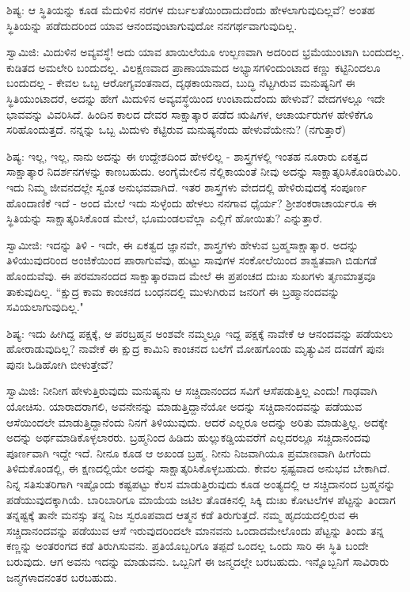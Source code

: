 ಶಿಷ್ಯ: ಆ ಸ್ಥಿತಿಯನ್ನು ಕೂಡ ಮೆದುಳಿನ ನರಗಳ ದುರ್ಬಲತೆಯಿಂದಾದುದೆಂದು ಹೇಳಲಾಗುವುದಿಲ್ಲವೆ? ಅಂತಹ ಸ್ಥಿತಿಯನ್ನು ಪಡೆದುದರಿಂದ ಯಾವ ಆನಂದವುಂಟಾಗುವುದೋ ನನಗರ್ಥವಾಗುವುದಿಲ್ಲ.

ಸ್ವಾಮಿಜಿ: ಮಿದುಳಿನ ಅವ್ಯವಸ್ಥೆ! ಅದು ಯಾವ ಖಾಯಿಲೆಯೂ ಉಲ್ಬಣವಾಗಿ ಅದರಿಂದ ಭ್ರಮೆಯುಂಟಾಗಿ ಬಂದುದಲ್ಲ. ಕುಡಿತದ ಅಮಲೇರಿ ಬಂದುದಲ್ಲ. ವಿಲಕ್ಷಣವಾದ ಪ್ರಾಣಾಯಾಮದ ಅಭ್ಯಾಸಗಳಿಂದುಂಟಾದ ಕಣ್ಣು ಕಟ್ಟಿನಿಂದಲೂ ಬಂದುದಲ್ಲ - ಕೇವಲ ಒಬ್ಬ ಆರೋಗ್ಯವಂತನಾದ, ದೃಢಕಾಯನಾದ, ಬುದ್ಧಿ ನೆಟ್ಟಗಿರುವ ಮನುಷ್ಯನಿಗೆ ಈ ಸ್ಥಿತಿಯುಂಟಾದರೆ, ಅದನ್ನು ಹೇಗೆ ಮಿದುಳಿನ ಅವ್ಯವಸ್ಥೆಯಿಂದ ಉಂಟಾದುದೆಂದು ಹೇಳುವೆ? ವೇದಗಳಲ್ಲೂ ಇದೇ ಭಾವವನ್ನು ವಿವರಿಸಿದೆ. ಹಿಂದಿನ ಕಾಲದ ದೇವರ ಸಾಕ್ಷಾತ್ಕಾರ ಪಡೆದ ಋಷಿಗಳ, ಆಚಾರ್ಯರುಗಳ ಹೇಳಿಕೆಗೂ ಸರಿಹೊಂದುತ್ತದೆ. ನನ್ನನ್ನು ಒಬ್ಬ ಮಿದುಳು ಕೆಟ್ಟಿರುವ ಮನುಷ್ಯನೆಂದು ಹೇಳುವೆಯೇನು? (ನಗುತ್ತಾರೆ)

ಶಿಷ್ಯ: ಇಲ್ಲ, ಇಲ್ಲ, ನಾನು ಅದನ್ನು ಈ ಉದ್ದೇಶದಿಂದ ಹೇಳಲಿಲ್ಲ - ಶಾಸ್ತ್ರಗಳಲ್ಲಿ ಇಂತಹ ನೂರಾರು ಏಕತ್ವದ ಸಾಕ್ಷಾತ್ಕಾರ ನಿದರ್ಶನಗಳನ್ನು ಕಾಣಬಹುದು. ಅಂಗೈಮೇಲಿನ ನೆಲ್ಲಿಕಾಯಂತೆ ನೀವು ಅದನ್ನು ಸಾಕ್ಷಾತ್ಕರಿಸಿಕೊಂಡಿರುವಿರಿ. ಇದು ನಿಮ್ಮ ಜೀವನದಲ್ಲೇ ಸ್ವಂತ ಅನುಭವವಾಗಿದೆ. ಇತರ ಶಾಸ್ತ್ರಗಳು ವೇದದಲ್ಲಿ ಹೇಳಿರುವುದಕ್ಕೆ ಸಂಪೂರ್ಣ ಹೊಂದಾಣಿಕೆ ಇದೆ - ಅಂದ ಮೇಲೆ ಇದು ಸುಳ್ಳೆಂದು ಹೇಳಲು ನನಗಾವ ಧೈರ್ಯ? ಶ‍್ರೀಶಂಕರಾಚಾರ್ಯರೂ ಈ ಸ್ಥಿತಿಯನ್ನು ಸಾಕ್ಷಾತ್ಕರಿಸಿಕೊಂಡ ಮೇಲೆ, ಭೂಮಂಡಲವೆಲ್ಲಾ ಎಲ್ಲಿಗೆ ಹೋಯಿತು? ಎನ್ನುತ್ತಾರೆ.

ಸ್ವಾಮೀಜಿ: ಇದನ್ನು ತಿಳಿ - ಇದೇ, ಈ ಏಕತ್ವದ ಜ್ಞಾನವೇ, ಶಾಸ್ತ್ರಗಳು ಹೇಳುವ ಬ್ರಹ್ಮಸಾಕ್ಷಾತ್ಕಾರ. ಅದನ್ನು ತಿಳಿಯುವುದರಿಂದ ಅಂಜಿಕೆಯಿಂದ ಪಾರಾಗುವೆವು, ಹುಟ್ಟು ಸಾವುಗಳ ಸಂಕೋಲೆಯಿಂದ ಶಾಶ್ವತವಾಗಿ ಬಿಡುಗಡೆ ಹೊಂದುವೆವು. ಈ ಪರಮಾನಂದದ ಸಾಕ್ಷಾತ್ಕಾರವಾದ ಮೇಲೆ ಈ ಪ್ರಪಂಚದ ದುಃಖ ಸುಖಗಳು ತೃಣಮಾತ್ರವೂ ತಾಕುವುದಿಲ್ಲ. “ಕ್ಷುದ್ರ ಕಾಮ ಕಾಂಚನದ ಬಂಧನದಲ್ಲಿ ಮುಳುಗಿರುವ ಜನರಿಗೆ ಈ ಬ್ರಹ್ಮಾನಂದವನ್ನು ಸವಿಯಲಾಗುವುದಿಲ್ಲ."

ಶಿಷ್ಯ: ಇದು ಹೀಗಿದ್ದ ಪಕ್ಷಕ್ಕೆ, ಆ ಪರಬ್ರಹ್ಮನ ಅಂಶವೇ ನಮ್ಮಲ್ಲೂ ಇದ್ದ ಪಕ್ಷಕ್ಕೆ ನಾವೇಕೆ ಆ ಆನಂದವನ್ನು ಪಡೆಯಲು ಹೋರಾಡುವುದಿಲ್ಲ? ನಾವೇಕೆ ಈ ಕ್ಷುದ್ರ ಕಾಮಿನಿ ಕಾಂಚನದ ಬಲೆಗೆ ಮೋಹಗೊಂಡು ಮೃತ್ಯುವಿನ ದವಡೆಗೆ ಪುನಃ ಪುನಃ ಓಡಿಹೋಗಿ ಬೀಳುತ್ತೇವೆ?

ಸ್ವಾಮಿಜಿ: ನೀನೀಗ ಹೇಳುತ್ತಿರುವುದು ಮನುಷ್ಯನು ಆ ಸಚ್ಚಿದಾನಂದದ ಸವಿಗೆ ಆಸೆಪಡುತ್ತಿಲ್ಲ ಎಂದು! ಗಾಢವಾಗಿ ಯೋಚಿಸು. ಯಾರಾದರಾಗಲಿ, ಅವನೇನನ್ನು ಮಾಡುತ್ತಿದ್ದಾನೆಯೋ ಅದನ್ನು ಸಚ್ಚಿದಾನಂದವನ್ನು ಪಡೆಯುವ ಆಸೆಯಿಂದಲೇ ಮಾಡುತ್ತಿದ್ದಾನೆಂದು ನಿನಗೆ ತಿಳಿಯುವುದು. ಆದರೆ ಎಲ್ಲರೂ ಅದನ್ನು ಅರಿತು ಮಾಡುತ್ತಿಲ್ಲ. ಅದಕ್ಕೇ ಅದನ್ನು ಅರ್ಥಮಾಡಿಕೊಳ್ಳಲಾರರು. ಬ್ರಹ್ಮನಿಂದ ಹಿಡಿದು ಹುಲ್ಲುಕಡ್ಡಿಯವರೆಗೆ ಎಲ್ಲದರಲ್ಲೂ ಸಚ್ಚಿದಾನಂದವು ಪೂರ್ಣವಾಗಿ ಇದ್ದೇ ಇದೆ. ನೀನೂ ಕೂಡ ಆ ಅಖಂಡ ಬ್ರಹ್ಮ. ನೀನು ನಿಜವಾಗಿಯೂ ಪ್ರಮಾಣವಾಗಿ ಹೀಗೆಂದು ತಿಳಿದುಕೊಂಡಲ್ಲಿ, ಈ ಕ್ಷಣದಲ್ಲಿಯೇ ಅದನ್ನು ಸಾಕ್ಷಾತ್ಕರಿಸಿಕೊಳ್ಳಬಹುದು. ಕೇವಲ ಸ್ಪಷ್ಟವಾದ ಅನುಭವ ಬೇಕಾಗಿದೆ. ನಿನ್ನ ಸತಿಸುತರಿಗಾಗಿ ಇಷ್ಟೊಂದು ಕಷ್ಟಪಟ್ಟು ಕೆಲಸ ಮಾಡುತ್ತಿರುವುದು ಕೂಡ ಅಂತ್ಯದಲ್ಲಿ ಆ ಸಚ್ಚಿದಾನಂದ ಬ್ರಹ್ಮನನ್ನು ಪಡೆಯುವುದಕ್ಕಾಗಿಯೆ. ಬಾರಿಬಾರಿಗೂ ಮಾಯೆಯ ಜಟಿಲ ತೊಡಕಿನಲ್ಲಿ ಸಿಕ್ಕಿ ದುಃಖ ಕೋಟಲೆಗಳ ಪೆಟ್ಟನ್ನು ತಿಂದಾಗ ತನ್ನಷ್ಟಕ್ಕೆ ತಾನೇ ಮನಸ್ಸು ತನ್ನ ನಿಜ ಸ್ವರೂಪವಾದ ಆತ್ಮನ ಕಡೆ ತಿರುಗುತ್ತದೆ. ನಮ್ಮ ಹೃದಯದಲ್ಲಿರುವ ಈ ಸಚ್ಚಿದಾನಂದವನ್ನು ಪಡೆಯುವ ಆಸೆ ಇರುವುದರಿಂದಲೇ ಮಾನವನು ಒಂದಾದಮೇಲೊಂದು ಪೆಟ್ಟನ್ನು ತಿಂದು ತನ್ನ ಕಣ್ಣನ್ನು ಅಂತರಂಗದ ಕಡೆ ತಿರುಗಿಸುವನು. ಪ್ರತಿಯೊಬ್ಬರಿಗೂ ತಪ್ಪದೆ ಒಂದಲ್ಲ ಒಂದು ಸಾರಿ ಈ ಸ್ಥಿತಿ ಬಂದೇ ಬರುವುದು. ಆಗ ಅವನು ಇದನ್ನು ಮಾಡುವನು. ಒಬ್ಬನಿಗೆ ಈ ಜನ್ಮದಲ್ಲೇ ಬರಬಹುದು. ಇನ್ನೊಬ್ಬನಿಗೆ ಸಾವಿರಾರು ಜನ್ಮಗಳಾದನಂತರ ಬರಬಹುದು.

